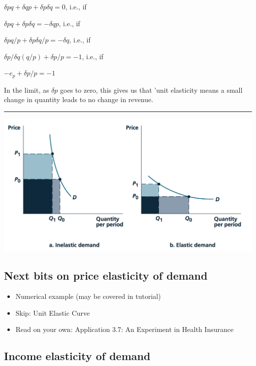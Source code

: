 \documentclass[]{article}
\providecommand{\tightlist}{%
  \setlength{\itemsep}{0pt}\setlength{\parskip}{0pt}}
\begin{document}
\(\delta p q + \delta q p + \delta p \delta q=0\), i.e., if

\(\delta p q + \delta p \delta q =-\delta q p\), i.e., if

\(\delta p q/p + \delta p \delta q/p =-\delta q\), i.e., if

\(\delta p/ \delta q (q/p) + \delta p /p =-1\), i.e., if

\(-e_p + \delta p /p = -1\)

In the limit, as \(\delta p\) goes to zero, this gives us that 'unit elasticity means a small change in quantity leads to no change in revenue.

\begin{center}\rule{0.5\linewidth}{\linethickness}\end{center}

\includegraphics{picsfigs/elast_revenue.png}\\

\hypertarget{next-bits-on-price-elasticity-of-demand}{%
\subsection{Next bits on price elasticity of demand}\label{next-bits-on-price-elasticity-of-demand}}

\begin{itemize}
\tightlist
\item
  Numerical example (may be covered in tutorial)
\item
  Skip: Unit Elastic Curve
\item
  Read on your own: Application 3.7: An Experiment in Health Insurance
\end{itemize}

\hypertarget{income-elasticity-of-demand}{%
\subsection{Income elasticity of demand}\label{income-elasticity-of-demand}}
\end{document}
